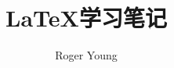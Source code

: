 \documentclass{ctexbook}
\newcommand{\documentTitle}
    {\texorpdfstring{\LaTeX 学习笔记}{LaTeX 学习笔记}}
\newcommand{\documentAuthor}{Roger Young}
\begin{document}
\title{\documentTitle}
\author{\documentAuthor}

\maketitle
\tableofcontents

%
%
%




\printindex
\printglossaries
\end{document}
